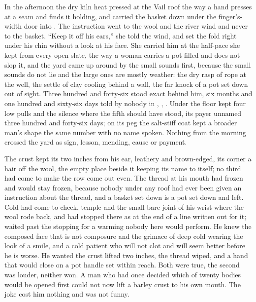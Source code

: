 In the afternoon the dry kiln heat pressed at the Vail roof the way a hand presses at a seam and finds it holding, and  carried the basket down under the finger's-width door into . The instruction went to the wool and the river wind and never to the basket. “Keep it off his ears,” she told the wind, and set the fold right under his chin without a look at his face. She carried him at the half-pace she kept from every open slate, the way a woman carries a pot filled and does not slop it, and the yard came up around  by the small sounds first, because the small sounds do not lie and the large ones are mostly weather: the dry rasp of rope at the well, the settle of clay cooling behind a wall, the far knock of a pot set down out of sight. Three hundred and forty-six stood exact behind him, six months and one hundred and sixty-six days told by nobody in , , . Under the floor  kept four low pulls and the silence where the fifth should have stood, its payer unnamed three hundred and forty-six days; on its peg the salt-stiff coat kept a broader man's shape the same number with no name spoken. Nothing from the morning crossed the yard as sign, lesson, mending, cause or payment.

The crust kept its two inches from his ear, leathery and brown-edged, its corner a hair off the wool, the empty place beside it keeping its name to itself; no third had come to make the row come out even. The thread at his mouth had frozen and would stay frozen, because nobody under any roof had ever been given an instruction about the thread, and a basket set down is a pot set down and left. Cold had come to cheek, temple and the small bare joint of his wrist where the wool rode back, and had stopped there as at the end of a line written out for it;  waited past the stopping for a warming nobody here would perform. He knew the composed face that is not composure and the grimace of deep cold wearing the look of a smile, and a cold patient who will not clot and will seem better before he is worse. He wanted the crust lifted two inches, the thread wiped, and a hand that would close on a pot handle set within reach. Both were true, the second was louder, neither won. A man who had once decided which of twenty bodies would be opened first could not now lift a barley crust to his own mouth. The joke cost him nothing and was not funny.

